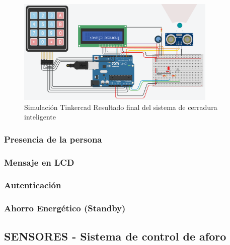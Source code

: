 \documentclass{article}
\begin{document}
\begin{figure}[H]
    \centering
    \includegraphics[width=0.85\textwidth]{./img/ckpt_6.png}
    \caption{Simulación Tinkercad Resultado final del sistema de cerradura inteligente}
    \label{fig:cerradura_smart}
\end{figure}


\subsubsection{Presencia de la persona}

\subsubsection{Mensaje en LCD}

\subsubsection{Autenticación}

\subsubsection{Ahorro Energético (Standby)}

\subsection{SENSORES - Sistema de control de aforo}

\end{document}
